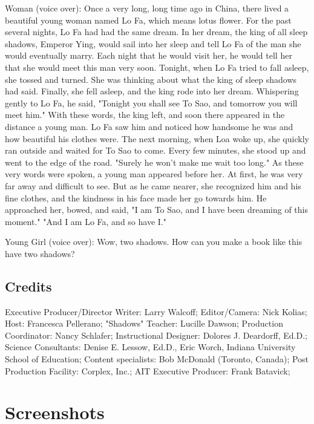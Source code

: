 Woman (voice over): Once a very long, long time ago in China, there lived a beautiful young woman named Lo Fa, which means lotus flower. For the past several nights, Lo Fa had had the same dream. In her dream, the king of all sleep shadows, Emperor Ying, would sail into her sleep and tell Lo Fa of the man she would eventually marry. Each night that he would visit her, he would tell her that she would meet this man very soon. Tonight, when Lo Fa tried to fall asleep, she tossed and turned. She was thinking about what the king of sleep shadows had said. Finally, she fell asleep, and the king rode into her dream. Whispering gently to Lo Fa, he said, "Tonight you shall see To Sao, and tomorrow you will meet him." With these words, the king left, and soon there appeared in the distance a young man. Lo Fa saw him and noticed how handsome he was and how beautiful his clothes were. The next morning, when Loa woke up, she quickly ran outside and waited for To Sao to come. Every few minutes, she stood up and went to the edge of the road. "Surely he won't make me wait too long." As these very words were spoken, a young man appeared before her. At first, he was very far away and difficult to see. But as he came nearer, she recognized him and his fine clothes, and the kindness in his face made her go towards him. He approached her, bowed, and said, "I am To Sao, and I have been dreaming of this moment." "And I am Lo Fa, and so have I."

Young Girl (voice over): Wow, two shadows. How can you make a book like this have two shadows?

\subsection{Credits}

Executive Producer/Director Writer: Larry Walcoff;
Editor/Camera: Nick Kolias;
Host: Francesca Pellerano;
"Shadows" Teacher: Lucille Dawson;
Production Coordinator: Nancy Schlafer;
Instructional Designer: Dolores J. Deardorff, Ed.D.;
Science Consultants: Denise E. Lessow, Ed.D., Eric Worch, Indiana University School of Education;
Content specialists: Bob McDonald (Toronto, Canada);
Post Production Facility: Corplex, Inc.;
AIT Executive Producer: Frank Batavick;

\clearpage
\newpage

\section{Screenshots}

